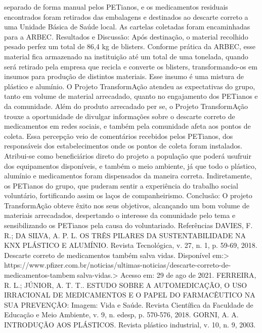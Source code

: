 separado de forma manual pelos PETianos, e os medicamentos residuais encontrados foram 
retirados das embalagens e destinados ao descarte correto a uma Unidade Básica de Saúde local. 
As cartelas coletadas foram encaminhadas para a ARBEC. Resultados e Discussão: Após 
destinação, o material recolhido pesado perfez um total de 86,4 kg de blisters. Conforme prática 
da ARBEC, esse material fica armazenado na instituição até um total de uma tonelada, quando 
será retirado pela empresa que recicla e converte os blisters, transformando-os em insumos para 
produção de distintos materiais. Esse insumo é uma mistura de plástico e alumínio. O Projeto 
TransformAção atendeu as expectativas do grupo, tanto em volume de material arrecadado, quanto 
no engajamento dos PETianos e da comunidade. Além do produto arrecadado per se, o Projeto 
TransformAção trouxe a oportunidade de divulgar informações sobre o descarte correto de 
medicamentos em redes sociais, e também pela comunidade afeta aos pontos de coleta. Essa 
percepção veio de comentários recebidos pelos PETianos, dos responsáveis dos estabelecimentos 
onde os pontos de coleta foram instalados. Atribui-se como beneficiários direto do projeto a 
população que poderá usufruir dos equipamentos disponíveis, e também o meio ambiente, já que 
todo o plástico, alumínio e medicamentos foram dispensados da maneira correta. Indiretamente, 
os PETianos do grupo, que puderam sentir a experiência do trabalho social voluntário, fortificando 
assim os laços de companheirismo. Conclusão: O projeto TransformAção obteve êxito nos seus 
objetivos, alcançando um bom volume de materiais arrecadados, despertando o interesse da 
comunidade pelo tema e sensibilizando os PETianos pela causa do voluntariado.
Referências
DAVIES, F. R.; DA SILVA, A. P. L. OS TRÊS PILARES DA SUSTENTABILIDADE NA KNX 
PLÁSTICO E ALUMÍNIO. Revista Tecnológica, v. 27, n. 1, p. 59-69, 2018.
Descarte correto de medicamentos também salva vidas. Disponível em:> 
https://www.pfizer.com.br/noticias/ultimas-noticias/descarte-correto-de-medicamentos-tambemsalva-vidas.> Acesso em: 29 de ago de 2021.
FERREIRA, R. L.; JÚNIOR, A. T. T.. ESTUDO SOBRE A AUTOMEDICAÇÃO, O USO 
IRRACIONAL DE MEDICAMENTOS E O PAPEL DO FARMACÊUTICO NA SUA 
PREVENÇÃO: Imagem: Vida e Saúde. Revista Científica da Faculdade de Educação e Meio 
Ambiente, v. 9, n. edesp, p. 570-576, 2018.
GORNI, A. A. INTRODUÇÃO AOS PLÁSTICOS. Revista plástico industrial, v. 10, n. 9, 2003.




